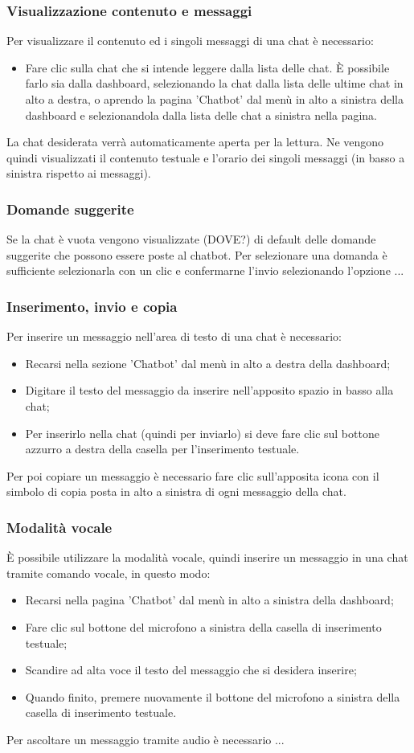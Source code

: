 \documentclass[10pt, a4paper]{article}
\begin{document}
\subsubsection{Visualizzazione contenuto e messaggi}
Per visualizzare il contenuto ed i singoli messaggi di una chat è necessario:
\begin{itemize}
    \item Fare clic sulla chat che si intende leggere dalla lista delle chat. È possibile farlo sia dalla dashboard, selezionando la chat dalla lista delle ultime chat in alto a destra, o aprendo la pagina 'Chatbot' dal menù in alto a sinistra della dashboard e selezionandola dalla lista delle chat a sinistra nella pagina.
\end{itemize}
La chat desiderata verrà automaticamente aperta per la lettura. Ne vengono quindi visualizzati il contenuto testuale e l'orario dei singoli messaggi (in basso a sinistra rispetto ai messaggi). 
\subsubsection{Domande suggerite}
Se la chat è vuota vengono visualizzate (DOVE?) di default delle domande suggerite che possono essere poste al chatbot. Per selezionare una domanda è sufficiente selezionarla con un clic e confermarne l'invio selezionando l'opzione ...
\subsubsection{Inserimento, invio e copia}
Per inserire un messaggio nell'area di testo di una chat è necessario:
\begin{itemize}
    \item Recarsi nella sezione 'Chatbot' dal menù in alto a destra della dashboard;
    \item Digitare il testo del messaggio da inserire nell'apposito spazio in basso alla chat;
    \item Per inserirlo nella chat (quindi per inviarlo) si deve fare clic sul bottone azzurro a destra della casella per l'inserimento testuale.
\end{itemize}
Per poi copiare un messaggio è necessario fare clic sull'apposita icona con il simbolo di copia posta in alto a sinistra di ogni messaggio della chat.
\subsubsection{Modalità vocale}
È possibile utilizzare la modalità vocale, quindi inserire un messaggio in una chat tramite comando vocale, in questo modo:
\begin{itemize}
    \item Recarsi nella pagina 'Chatbot' dal menù in alto a sinistra della dashboard;
    \item Fare clic sul bottone del microfono a sinistra della casella di inserimento testuale;
    \item Scandire ad alta voce il testo del messaggio che si desidera inserire;
    \item Quando finito, premere nuovamente il bottone del microfono a sinistra della casella di inserimento testuale.
\end{itemize}
Per ascoltare un messaggio tramite audio è necessario ...
\end{document}
